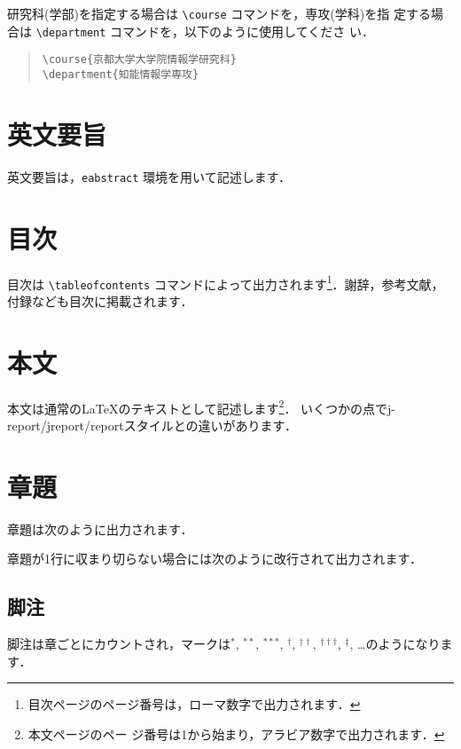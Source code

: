 \documentclass[
  sotsuron]{kuee}
\begin{document}
研究科(学部)を指定する場合は \verb+\course+ コマンドを，専攻(学科)を指
定する場合は \verb+\department+ コマンドを，以下のように使用してくださ
い．

\begin{quote}
  \begin{verbatim}
\course{京都大学大学院情報学研究科}
\department{知能情報学専攻}
\end{verbatim}
\end{quote}

\hypertarget{ux82f1ux6587ux8981ux65e8}{%
\section{英文要旨}\label{ux82f1ux6587ux8981ux65e8}}

英文要旨は，\verb+eabstract+ 環境を用いて記述します．

\hypertarget{ux76eeux6b21}{%
\section{目次}\label{ux76eeux6b21}}

目次は \verb+\tableofcontents+ コマンドによって出力されます\footnote
{目次ページのページ番号は，ローマ数字で出力されます．}．謝辞，参考文献，
付録なども目次に掲載されます．

\hypertarget{ux672cux6587}{%
\section{本文}\label{ux672cux6587}}

本文は通常の\LaTeX のテキストとして記述します\footnote{本文ページのペー
  ジ番号は1から始まり，アラビア数字で出力されます．}．
いくつかの点でj-report/jreport/reportスタイルとの違いがあります．

\hypertarget{ux7ae0ux984c}{%
\section{章題}\label{ux7ae0ux984c}}

章題は次のように出力されます．

章題が1行に収まり切らない場合には次のように改行されて出力されます．

\hypertarget{ux811aux6ce8}{%
\subsection{脚注}\label{ux811aux6ce8}}

脚注は章ごとにカウントされ，マークは\(^{*}\), \(^{**}\), \(^{***}\),
\(^{\dagger}\), \(^{\dagger\dagger}\), \(^{\dagger\dagger\dagger}\),
\(^{\ddagger}\), \ldots のようになります．
\end{document}
